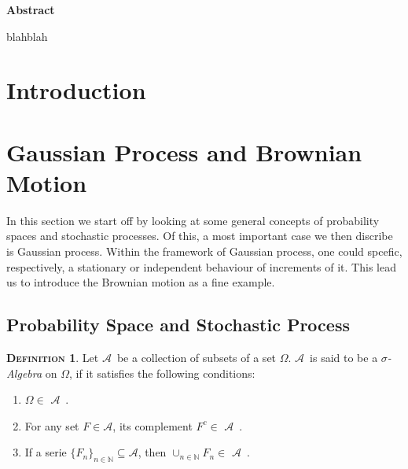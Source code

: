 \documentclass[a4paper, twoside, 11pt]{article}
\theoremstyle{definition}
\newtheorem{definition}{\scshape Definition}[section]
\def\AA{$\mathscr{A}$\ }
\newcommand{\compl}[1]{{#1}^{c}}
\renewenvironment{abstract}{
	\begin{center}
		  \Large
		  \textbf{Abstract}
		  \hspace{2em}
	\end{center}				
  }{}
\begin{document}
  
  \newpage

  \thispagestyle{empty}
  \begin{abstract}
	blahblah
  \end{abstract}
\newpage

\thispagestyle{empty}
\mbox{}
\newpage
\fancyhead[LO, RE]{}
\fancyfoot[LE, RO]{}
\tableofcontents
\newpage
\thispagestyle{empty}
\mbox{}
\newpage

\fancyhead[RO]{\leftmark}
\fancyhead[LE]{\rightmark}
\fancyfoot[LE, RO]{\large \thepage}
\setcounter{section}{0}
\setcounter{page}{1}
\section{Introduction}

\newpage

\section{Gaussian Process and Brownian Motion}
In this section we start off by looking at some general concepts of probability spaces and stochastic processes. Of this, a most important case we then discribe is Gaussian process. Within the framework of Gaussian process, one could spcefic, respectively, a stationary or independent behaviour of increments of it. This lead us to introduce the Brownian motion as a fine example.

\subsection{Probability Space and Stochastic Process }
\begin{definition}
  Let \AA be a collection of subsets of a set $\Omega$. \AA is said to be a \emph{$\sigma$- Algebra} on $\Omega$, if it satisfies the following conditions:
  \begin{enumerate}[topsep=0pt, itemsep=-1ex, partopsep=1ex, parsep=1ex, label=(\roman*)]
	\item $\Omega \in $ \AA.
	\item For any set $F \in \mathscr{A}$, its complement $\compl{F} \in$ \AA.
	\item If a serie $\{F_n\}_{n \in \mathbb{N}} \subseteq \mathscr{A}$, then $\cup_{n \in \mathbb{N}}F_n \in $ \AA.
  \end{enumerate}
\end{definition}
\end{document}
